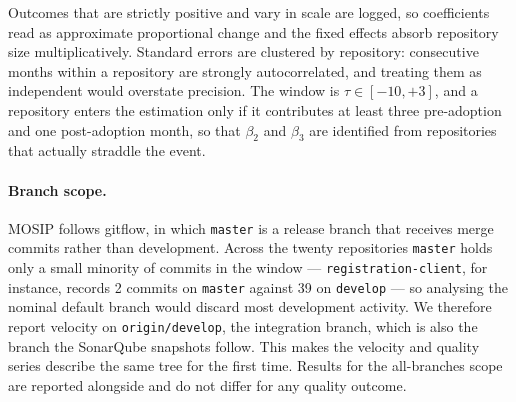 Outcomes that are strictly positive and vary in scale are logged, so
coefficients read as approximate proportional change and the fixed effects
absorb repository size multiplicatively. Standard errors are clustered by
repository: consecutive months within a repository are strongly
autocorrelated, and treating them as independent would overstate precision.
The window is $\tau \in [-10, +3]$, and a repository enters the estimation
only if it contributes at least three pre-adoption and one post-adoption
month, so that $\beta_2$ and $\beta_3$ are identified from repositories that
actually straddle the event.

\paragraph{Branch scope.} MOSIP follows gitflow, in which \texttt{master} is a
release branch that receives merge commits rather than development. Across the
twenty repositories \texttt{master} holds only a small minority of commits in
the window --- \texttt{registration-client}, for instance, records 2 commits on
\texttt{master} against 39 on \texttt{develop} --- so analysing the nominal
default branch would discard most development activity. We therefore report
velocity on \texttt{origin/develop}, the integration branch, which is also the
branch the SonarQube snapshots follow. This makes the velocity and quality
series describe the same tree for the first time. Results for the
all-branches scope are reported alongside and do not differ for any quality
outcome.



